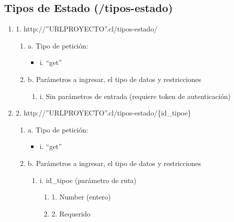 \subsection{Tipos de Estado (/tipos-estado)}

\begin{enumerate}
    \item 1. http://”URLPROYECTO”.cl/tipos-estado/
    \begin{enumerate}
        \item a. Tipo de petición:
            \begin{itemize}
               \item i. “get”
            \end{itemize}
        \item b. Parámetros a ingresar, el tipo de datos y restricciones
            \begin{enumerate}
                \item i. Sin parámetros de entrada (requiere token de autenticación)
            \end{enumerate}
    \end{enumerate}

    \item 2. http://”URLPROYECTO”.cl/tipos-estado/\{id\_tipoe\}
    \begin{enumerate}
        \item a. Tipo de petición:
            \begin{itemize}
               \item i. “get”
            \end{itemize}
        \item b. Parámetros a ingresar, el tipo de datos y restricciones
            \begin{enumerate}
                \item i. id\_tipoe (parámetro de ruta)
                    \begin{enumerate}
                        \item 1. Number (entero)
                        \item 2. Requerido
                    \end{enumerate}
            \end{enumerate}
    \end{enumerate}


\end{enumerate}
